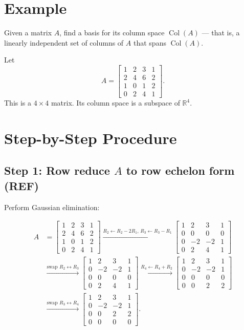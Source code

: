 \documentclass{article}
\begin{document}
\section*{Example}
Given a matrix $A$, find a basis for its column space $\operatorname{Col}(A)$ — that is, a linearly independent set of columns of $A$ that spans $\operatorname{Col}(A)$.



Let
\[
A = \begin{bmatrix}
1 & 2 & 3 & 1 \\
2 & 4 & 6 & 2 \\
1 & 0 & 1 & 2 \\
0 & 2 & 4 & 1
\end{bmatrix}.
\]
This is a $4 \times 4$ matrix. Its column space is a subspace of $\mathbb{R}^4$.

\section*{Step-by-Step Procedure}

\subsection*{Step 1: Row reduce $A$ to row echelon form (REF)}

Perform Gaussian elimination:

\begin{align*}
A &= 
\begin{bmatrix}
1 & 2 & 3 & 1 \\
2 & 4 & 6 & 2 \\
1 & 0 & 1 & 2 \\
0 & 2 & 4 & 1
\end{bmatrix}
\xrightarrow{R_2 \gets R_2 - 2R_1,\, R_3 \gets R_3 - R_1}
\begin{bmatrix}
1 & 2 & 3 & 1 \\
0 & 0 & 0 & 0 \\
0 & -2 & -2 & 1 \\
0 & 2 & 4 & 1
\end{bmatrix} \\
&\xrightarrow{\text{swap } R_2 \leftrightarrow R_3}
\begin{bmatrix}
1 & 2 & 3 & 1 \\
0 & -2 & -2 & 1 \\
0 & 0 & 0 & 0 \\
0 & 2 & 4 & 1
\end{bmatrix}
\xrightarrow{R_4 \gets R_4 + R_2}
\begin{bmatrix}
1 & 2 & 3 & 1 \\
0 & -2 & -2 & 1 \\
0 & 0 & 0 & 0 \\
0 & 0 & 2 & 2
\end{bmatrix} \\
&\xrightarrow{\text{swap } R_3 \leftrightarrow R_4}
\begin{bmatrix}
1 & 2 & 3 & 1 \\
0 & -2 & -2 & 1 \\
0 & 0 & 2 & 2 \\
0 & 0 & 0 & 0
\end{bmatrix}.
\end{align*}
\end{document}
